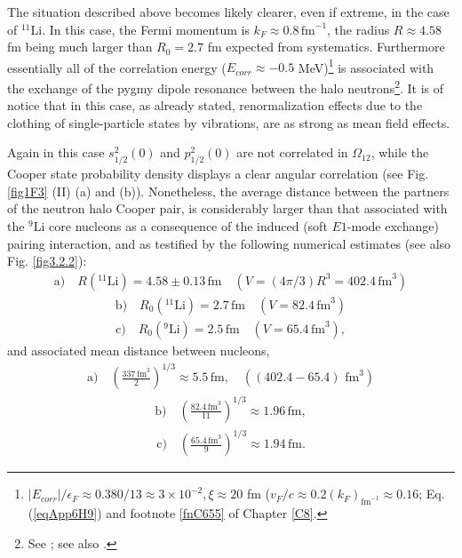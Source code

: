 The situation described above becomes likely clearer, even if extreme, in the case of $^{11}$Li. In this case, the Fermi momentum is $k_F\approx 0.8\, \text{fm}^{-1}$, the radius $R\approx 4.58 $fm being much larger than $R_0=2.7$ fm expected from systematics. Furthermore essentially all of the correlation energy ($E_{corr}\approx -0.5$ MeV)\footnote{\label{f18C4} $|E_{corr}|/\epsilon_F\approx 0.380/13\approx 3\times10^{-2}, \xi\approx 20 $ fm ($v_F/c\approx0.2(k_F)_{\text{fm}^{-1}}\approx 0.16$; Eq. (\ref{eqApp6H9}) and footnote \ref{fnC655} of Chapter \ref{C8}.}  is associated with the exchange of the  pygmy dipole resonance between the halo neutrons\footnote{See \cite{Barranco:01}; see also \cite{Broglia:19}.}. It is of notice that in this case, as already stated, renormalization effects due to the clothing of single-particle states by vibrations, are as strong as mean field effects.
\clearpage


 Again in this case $s_{1/2}^2(0)$ and $p_{1/2}^2(0)$ are not correlated in $\Omega_{12}$, while the Cooper state probability density displays a clear angular correlation 
  (see Fig. \ref{fig1F3} (II) (a) and (b)). Nonetheless, the average distance between the partners of the neutron halo Cooper pair, is considerably larger than that associated with the $^9$Li core nucleons as a consequence of the induced (soft $E1$-mode exchange) pairing interaction, and as testified by the following numerical estimates (see also Fig. \ref{fig3.2.2}):
\begin{align}\label{eq3.2.21}
 \text{a)}\quad R(^{11}\text{Li})= 4.58\pm 0.13 \,\text{fm}\quad (V=\left(4\pi/3\right)R^3=402.4 \,\text{fm}^3)
\end{align}
\begin{align}
 \text{b)}\quad R_0 (^{11}\text{Li})=2.7\,\text{fm}\quad (V=82.4\,\text{fm}^3)
\end{align}
\begin{align}
 \text{c)}\quad R_0 (^{9}\text{Li})=2.5\,\text{fm}\quad (V=65.4\,\text{fm}^3),
\end{align}
and associated mean distance between nucleons, 
\begin{align}\label{eq3.2.24}
 \text{a)}\quad \left(\frac{337\,\text{fm}^3}{2}\right)^{1/3}\approx 5.5\,\text{fm},\quad((402.4-65.4)\text{ fm}^3)
\end{align}
\begin{align}
 \text{b)}\quad \left(\frac{82.4\,\text{fm}^3}{11}\right)^{1/3}\approx 1.96\,\text{fm},
\end{align}
\begin{align}\label{eq4.3.9}
 \text{c)}\quad \left(\frac{65.4\,\text{fm}^3}{9}\right)^{1/3}\approx 1.94\,\text{fm}.
\end{align}



